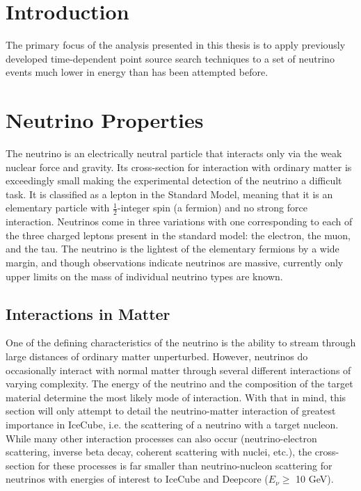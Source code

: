 \documentclass{gatech-thesis}
\begin{document}
\chapter{Introduction}


The primary focus of the analysis presented in this thesis is to apply previously developed time-dependent point source search techniques to a set of neutrino events much lower in energy than has been attempted before.

\chapter{Neutrino Properties}
The neutrino is an electrically neutral particle that interacts only via the weak nuclear force and gravity. Its cross-section for interaction with ordinary matter is exceedingly small making the experimental detection of the neutrino a difficult task. It is classified as a lepton in the Standard Model, meaning that it is an elementary particle with $\frac{1}{2}$-integer spin (a fermion) and no strong force interaction. Neutrinos come in three variations with one corresponding to each of the three charged leptons present in the standard model: the electron, the muon, and the tau. The neutrino is the lightest of the  elementary fermions by a wide margin, and though observations indicate neutrinos are massive, currently only upper limits on the mass of individual neutrino types are known.


\section{Interactions in Matter}
One of the defining characteristics of the neutrino is the ability to stream through large distances of ordinary matter unperturbed. However, neutrinos do occasionally interact with normal matter through several different interactions of varying complexity. The energy of the neutrino and the composition of the target material determine the most likely mode of interaction. With that in mind, this section will only attempt to detail the neutrino-matter interaction of greatest importance in IceCube, i.e. the scattering of a neutrino with a target nucleon. While many other interaction processes can also occur (neutrino-electron scattering, inverse beta decay, coherent scattering with nuclei, etc.), the cross-section for these processes is far smaller than neutrino-nucleon scattering for neutrinos with energies of interest to IceCube and Deepcore ($E_{\nu} \geq$ 10 GeV).
\end{document}
